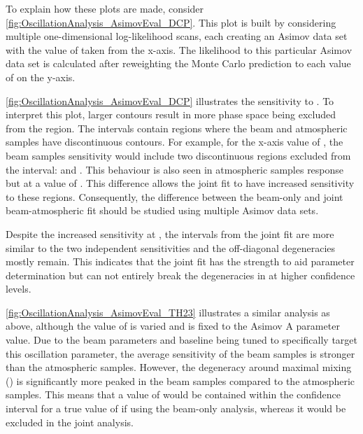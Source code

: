 To explain how these plots are made, consider \autoref{fig:OscillationAnalysis_AsimovEval_DCP}. This plot is built by considering multiple one-dimensional log-likelihood scans, each creating an Asimov data set with the value of  taken from the x-axis. The likelihood to this particular Asimov data set is calculated after reweighting the Monte Carlo prediction to each value of  on the y-axis.

\autoref{fig:OscillationAnalysis_AsimovEval_DCP} illustrates the sensitivity to . To interpret this plot, larger contours result in more phase space being excluded from the \quickmath{1\sigma} region. The \quickmath{1\sigma} intervals contain regions where the beam and atmospheric samples have discontinuous contours. For example, for the x-axis value of , the beam samples sensitivity would include two discontinuous regions excluded from the \quickmath{1\sigma} interval:  and . This behaviour is also seen in atmospheric samples response but at a value of . This difference allows the joint fit to have increased sensitivity to these regions. Consequently, the difference between the beam-only and joint beam-atmospheric fit should be studied using multiple Asimov data sets.

Despite the increased sensitivity at \quickmath{1\sigma}, the \quickmath{2\sigma} intervals from the joint fit are more similar to the two independent sensitivities and the off-diagonal degeneracies mostly remain. This indicates that the joint fit has the strength to aid parameter determination but can not entirely break the degeneracies in  at higher confidence levels. 

\autoref{fig:OscillationAnalysis_AsimovEval_TH23} illustrates a similar analysis as above, although the value of  is varied and  is fixed to the Asimov A parameter value. Due to the beam parameters and baseline being tuned to specifically target this oscillation parameter, the average sensitivity of the beam samples is stronger than the atmospheric samples. However, the degeneracy around maximal mixing () is significantly more peaked in the beam samples compared to the atmospheric samples. This means that a value of  would be contained within the \quickmath{1\sigma} confidence interval for a true value of  if using the beam-only analysis, whereas it would be excluded in the joint analysis.

